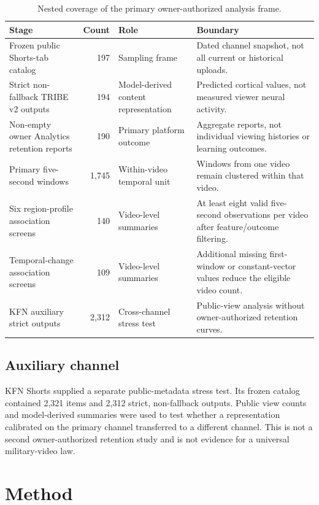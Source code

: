 \documentclass{ieeeaccess}
\begin{document}
\begin{table}[t]
\caption{Nested coverage of the primary owner-authorized analysis frame.}
\label{tab:coverage}
\centering
\renewcommand{\arraystretch}{1.1}
\tablebodyfont
\begin{tabularx}{\textwidth}{@{}lrlX@{}}
\toprule
Stage & Count & Role & Boundary \\
\midrule
Frozen public Shorts-tab catalog & 197 & Sampling frame & Dated channel snapshot, not all current or historical uploads. \\
Strict non-fallback TRIBE v2 outputs & 194 & Model-derived content representation & Predicted cortical values, not measured viewer neural activity. \\
Non-empty owner Analytics retention reports & 190 & Primary platform outcome & Aggregate reports, not individual viewing histories or learning outcomes. \\
Primary five-second windows & 1,745 & Within-video temporal unit & Windows from one video remain clustered within that video. \\
Six region-profile association screens & 140 & Video-level summaries & At least eight valid five-second observations per video after feature/outcome filtering. \\
Temporal-change association screens & 109 & Video-level summaries & Additional missing first-window or constant-vector values reduce the eligible video count. \\
KFN auxiliary strict outputs & 2,312 & Cross-channel stress test & Public-view analysis without owner-authorized retention curves. \\
\bottomrule
\end{tabularx}
\end{table}

\subsection{Auxiliary channel}
KFN Shorts supplied a separate public-metadata stress test. Its frozen catalog contained 2,321 items and 2,312 strict, non-fallback outputs. Public view counts and model-derived summaries were used to test whether a representation calibrated on the primary channel transferred to a different channel. This is not a second owner-authorized retention study and is not evidence for a universal military-video law.

\section{Method}
\label{sec:method}
\end{document}

